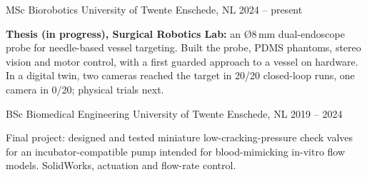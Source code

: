 \documentclass[10pt, a4paper]{awesome-cv}
\begin{document}

\begin{cventries}

\cventry
  {MSc Biorobotics}
  {University of Twente}
  {Enschede, NL}
  {2024 -- present}
  {
    \begin{cvitems}
      \item {\textbf{Thesis (in progress), Surgical Robotics Lab:} an Ø8\,mm dual-endoscope probe for needle-based vessel targeting. Built the probe, PDMS phantoms, stereo vision and motor control, with a first guarded approach to a vessel on hardware. In a digital twin, two cameras reached the target in 20/20 closed-loop runs, one camera in 0/20; physical trials next.}
    \end{cvitems}
  }

\cventry
  {BSc Biomedical Engineering}
  {University of Twente}
  {Enschede, NL}
  {2019 -- 2024}
  {
    \begin{cvitems}
      \item {Final project: designed and tested miniature low-cracking-pressure check valves for an incubator-compatible pump intended for blood-mimicking in-vitro flow models. SolidWorks, actuation and flow-rate control.}
    \end{cvitems}
  }

\end{cventries}

\end{document}
